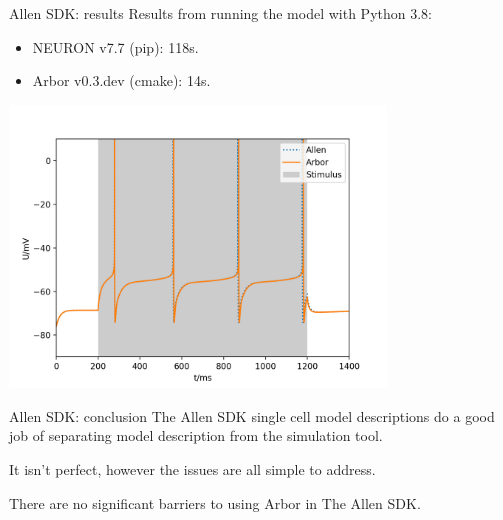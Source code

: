 \documentclass[aspectratio=43]{beamer}
\newcommand{\arbor}{{\ttfamily Arbor}\xspace}
\newcommand{\neuron}{{\ttfamily NEURON}\xspace}
\begin{document}
\begin{frame}[fragile]{Allen SDK: results}
    \vfill
    Results from running the model with Python 3.8:
    \begin{itemize}
        \item \neuron v7.7 (pip): 118s.
        \item \arbor v0.3.dev (cmake): 14s.
    \end{itemize}

    \vspace{-15pt}

    \begin{center}
    \includegraphics[width=0.75\textwidth]{images/allen-vs-arbor-no-sphere-here.png}
    \end{center}

\end{frame}

\begin{frame}[fragile]{Allen SDK: conclusion}
    The Allen SDK single cell model descriptions do a good job of separating model description from the simulation tool.

    \vspace{20pt}

    It isn't perfect, however the issues are all simple to address.

    \vspace{20pt}

    There are no significant barriers to using \arbor in The Allen SDK.
\end{frame}

\end{document}
